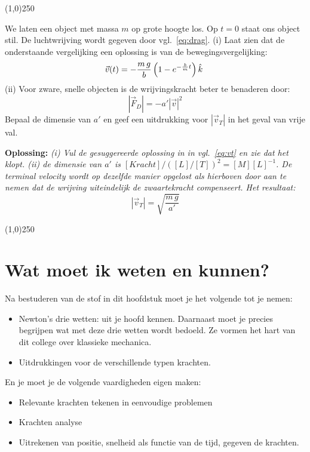 \begin{center}
\line(1,0){250}
\end{center}
\begin{voorbeeld} 
\label{ex:drag}
We laten een object met massa $m$ op grote hoogte los. Op $t=0$ staat ons object stil. De
luchtwrijving wordt gegeven door vgl.~\ref{eq:drag}. (i) Laat zien dat de onderstaande vergelijking
een oplossing is van de bewegingsvergelijking:
\begin{equation}
\vec{v}(t) = -\frac{m\,g}{b}\left(1-e^{-\frac{b}{m}t}\right)\hat{k}~
\end{equation}
(ii) Voor zware, snelle objecten is de wrijvingskracht beter te benaderen door:
\begin{equation}
|\vec{F}_D| = - a' |\vec{v}|^2
\end{equation}
Bepaal de dimensie van $a'$ en geef een uitdrukking voor $|\vec{v}_T|$ in het geval van vrije val.

{\bf Oplossing: } {\it  (i) Vul de gesuggereerde oplossing in in vgl.~\ref{eq:vt} en zie dat het klopt. 
(ii) de dimensie van $a'$ is $[Kracht]/([L]/[T])^2 = [M][L]^{-1}$. De terminal velocity wordt
op dezelfde manier opgelost als hierboven door aan te nemen dat de wrijving uiteindelijk
de zwaartekracht compenseert. Het resultaat:
\begin{equation}
|\vec{v}_T| = \sqrt{\frac{m\,g}{a'}}
\end{equation}
}
\end{voorbeeld}
\begin{center}
\line(1,0){250}
\end{center}

\section{Wat moet ik weten en kunnen?}

Na bestuderen van de stof in dit hoofdstuk moet je het volgende tot je nemen:
\begin{itemize}
\item Newton's drie wetten: uit je hoofd kennen. Daarnaast moet je precies begrijpen
wat met deze drie wetten wordt bedoeld. Ze vormen het hart van dit college over klassieke mechanica.
\item Uitdrukkingen voor de verschillende typen krachten. 
\end{itemize}
En je moet je de volgende vaardigheden eigen maken:
\begin{itemize}
\item Relevante krachten tekenen in eenvoudige problemen
\item Krachten analyse 
\item Uitrekenen van positie, snelheid als functie van de tijd, gegeven de krachten.
\end{itemize}

